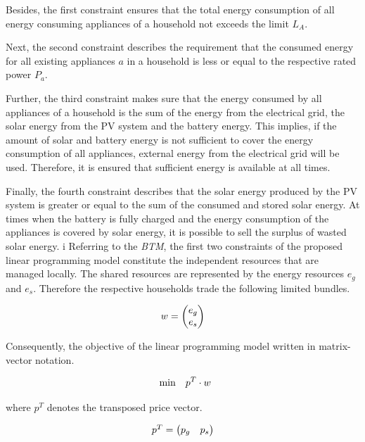 Besides, the first constraint ensures that the total energy consumption of all energy consuming
appliances of a household not exceeds the limit $L_{A}$. 

Next, the second constraint describes the requirement that the consumed energy
for all existing appliances $a$ in a household is less or equal 
to the respective rated power $P_{a}$.

Further, the third constraint makes sure that the energy consumed by all appliances
of a household is the sum of the energy from the electrical grid, the solar energy from 
the PV system and the battery energy. This implies, if the amount of solar and battery 
energy is not sufficient to cover the energy consumption of all appliances, external 
energy from the electrical grid will be used. Therefore, it is ensured 
that sufficient energy is available at all times.

Finally, the fourth constraint describes that the solar energy produced by the PV system 
is greater or equal to the sum of the consumed and stored solar energy. 
At times when the battery is fully charged and the energy consumption of the 
appliances is covered by solar energy, it is possible to sell the surplus of 
wasted solar energy. 
i
Referring to the \textit{BTM}, the first two constraints of the proposed linear
programming model constitute the independent resources that are managed locally.
The shared resources are represented by 
the energy resources $e_{g}$ and $e_{s}$.
Therefore the respective households trade the following limited bundles.

\begin{equation*}
    \begin{array}{ll@{}ll}
		w = 
		\begin{pmatrix}
			e_{g} \\
			e_{s}
		\end{pmatrix}
    \end{array}
\end{equation*}

Consequently, the objective of the linear programming 
model written in matrix-vector notation.

\begin{equation*}
    \begin{array}{ll@{}ll}
		\text{min}  & \displaystyle p^{T} \cdot w
    \end{array}
\end{equation*}

where $p^{T}$ denotes the transposed price vector.

\begin{equation*}
    \begin{array}{ll@{}ll}
		p^{T} = 
		\begin{pmatrix}
			p_{g} &
			p_{s}
		\end{pmatrix}
    \end{array}
\end{equation*}

